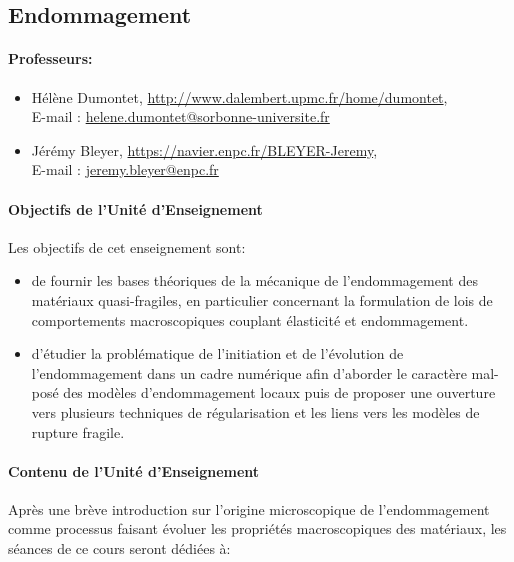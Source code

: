 \subsection{Endommagement}

\paragraph{Professeurs:}

\begin{itemize}
\item 
Hélène Dumontet, \url{http://www.dalembert.upmc.fr/home/dumontet},\\ E-mail : \href{mailto:helene.dumontet@sorbonne-universite.fr}{helene.dumontet@sorbonne-universite.fr}

\item
Jérémy Bleyer, \url{https://navier.enpc.fr/BLEYER-Jeremy},\\ E-mail : \href{mailto:jeremy.bleyer@enpc.fr}{jeremy.bleyer@enpc.fr}
\end{itemize}

\paragraph{Objectifs de l'Unité d'Enseignement}
Les objectifs de cet enseignement sont: 
\begin{itemize}
	\item de fournir les bases théoriques de la mécanique de l’endommagement des matériaux quasi-fragiles, en particulier concernant la formulation de lois de comportements macroscopiques couplant  élasticité et endommagement. 
 	\item d’étudier la problématique de l’initiation et de l’évolution de l’endommagement dans un cadre numérique afin d’aborder le caractère mal-posé des modèles d’endommagement locaux puis de proposer une ouverture vers plusieurs techniques de régularisation et les liens vers les modèles de rupture fragile.
\end{itemize}

\paragraph{Contenu de l’Unité d’Enseignement}
Après une brève introduction sur l’origine microscopique de l’endommagement comme processus faisant évoluer les propriétés macroscopiques des matériaux, les séances de ce cours seront dédiées à:


